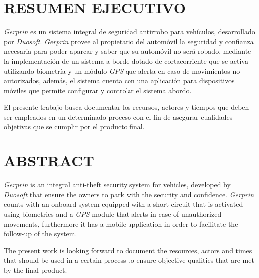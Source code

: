 \section*{RESUMEN EJECUTIVO}

\emph{Gerprin} es un sistema integral de seguridad antirrobo para vehículos, desarrollado por \emph{Duosoft}. \emph{Gerprin} provee al propietario del automóvil la seguridad y confianza necesaria para poder aparcar y saber que su automóvil no será robado, mediante la implementación de un sistema a bordo dotado de cortacorriente que se activa utilizando biometría y un módulo \emph{GPS} que alerta en caso de movimientos no autorizados, además, el sistema cuenta con una aplicación para dispositivos móviles que permite configurar y controlar el sistema abordo.

El presente trabajo busca documentar los recursos, actores y tiempos que deben ser empleados en un determinado proceso con el fin de asegurar cualidades objetivas que se cumplir por el producto final.

\section*{ABSTRACT}

\emph{Gerprin} is an integral anti-theft security system for vehicles, developed by \emph{Duosoft} that ensure the owners to park with the security and confidence. \emph{Gerprin} counts with an onboard system equipped with a short-circuit that is activated using biometrics and a \emph{GPS} module that alerts in case of unauthorized movements, furthermore  it has a mobile application in order to facilitate the follow-up of the system.

The present work is looking forward to document the resources, actors and times that should be used in a certain process to ensure objective qualities that are met by the final product.


